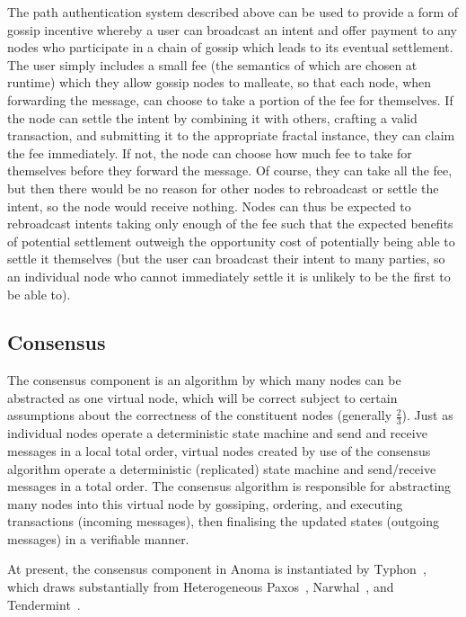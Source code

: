 \documentclass[
    9pt,            %
    commun,        %
    affiltop,       %
]{art}
\begin{document}
The path authentication system described above can be used to provide a
form of gossip incentive whereby a user can broadcast an intent and
offer payment to any nodes who participate in a chain of gossip which
leads to its eventual settlement. The user simply includes a small fee
(the semantics of which are chosen at runtime) which they allow gossip
nodes to malleate, so that each node, when forwarding the message, can
choose to take a portion of the fee for themselves. If the node can
settle the intent by combining it with others, crafting a valid
transaction, and submitting it to the appropriate fractal instance, they
can claim the fee immediately. If not, the node can choose how much fee
to take for themselves before they forward the message. Of course, they
can take all the fee, but then there would be no reason for other nodes
to rebroadcast or settle the intent, so the node would receive nothing.
Nodes can thus be expected to rebroadcast intents taking only enough of
the fee such that the expected benefits of potential settlement outweigh
the opportunity cost of potentially being able to settle it themselves
(but the user can broadcast their intent to many parties, so an
individual node who cannot immediately settle it is unlikely to be the
first to be able to).

\subsection{Consensus}\label{consensus-1}

The consensus component is an algorithm by which many nodes can be
abstracted as one virtual node, which will be correct subject to certain
assumptions about the correctness of the constituent nodes (generally
$\frac{2}{3}$). Just as individual
nodes operate a deterministic state machine and send and receive
messages in a local total order, virtual nodes created by use of the
consensus algorithm operate a deterministic (replicated) state machine
and send/receive messages in a total order. The consensus algorithm is
responsible for abstracting many nodes into this virtual node by
gossiping, ordering, and executing transactions (incoming messages),
then finalising the updated states (outgoing messages) in a verifiable
manner.

At present, the consensus component in Anoma is instantiated by
Typhon~\cite{typhon}, which draws substantially from Heterogeneous
Paxos~\cite{sheff2021heterogeneous}, Narwhal~\cite{danezis2022narwhal},
and Tendermint~\cite{buchman2018latest}.
\end{document}
